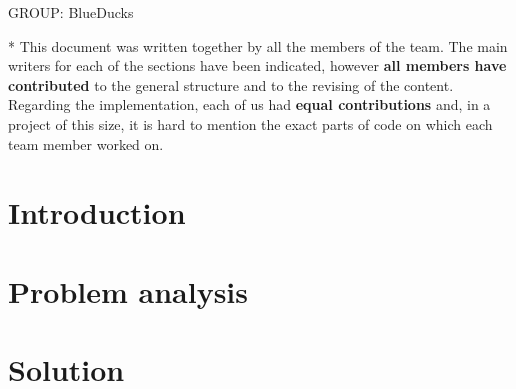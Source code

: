\documentclass[10pt,oneside]{article}
\begin{document}
\begin{titlepage}
GROUP: BlueDucks

\footnotesize ** This document was written together by all the members of the team. The main writers for each
of the sections have been indicated, however \textbf{all members have contributed} to the general structure
and to the revising of the content. Regarding the implementation, each of us had \textbf{equal contributions}
and, in a project of this size, it is hard to mention the exact parts of code on which each team member worked
on.
\end{titlepage}








\section{Introduction}




\section{Problem analysis}
\label{sec:problem}


\section{Solution}
\label{sec:solution}

\end{document}
